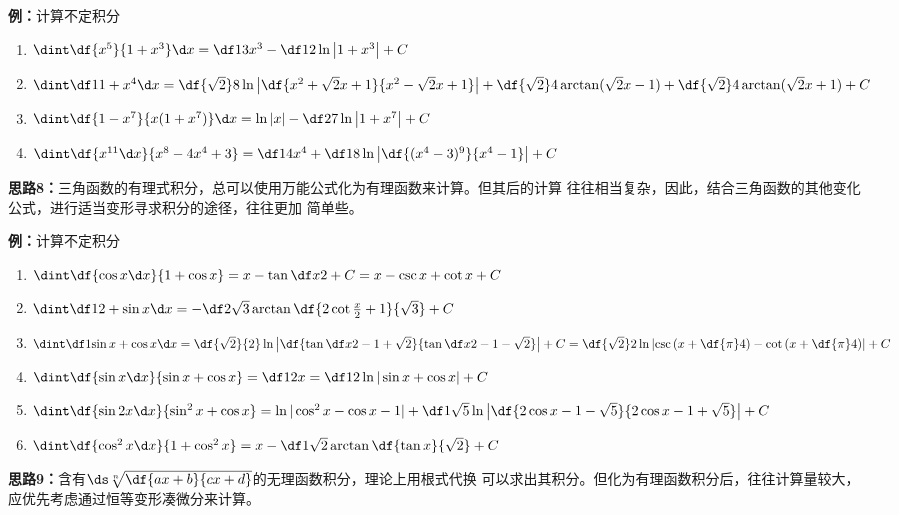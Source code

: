 {\bf 例：}计算不定积分
\begin{enumerate}[(1)]
  \setlength{\itemindent}{1cm}
  \item $\dint\df{x^5}{1+x^3}\d x=\df13x^3-\df12\ln\left|1+x^3\right|+C$
  \item $\dint\df1{1+x^4}\d x=\df{\sqrt 2}8\ln\left|
  \df{x^2+\sqrt2x+1}{x^2-\sqrt2x+1}\right|+\df{\sqrt 2}4\arctan(\sqrt2x-1)
  +\df{\sqrt2}4\arctan(\sqrt2x+1)+C$
  \item $\dint\df{1-x^7}{x(1+x^7)}\d x=\ln|x|-\df27\ln\left|1+x^7\right|+C$
  \item $\dint\df{x^{11}\d x}{x^8-4x^4+3}=\df14x^4+\df18
  \ln\left|\df{(x^4-3)^9}{x^4-1}\right|+C$
\end{enumerate}

\begin{shaded}
{\bf 思路8：}三角函数的有理式积分，总可以使用万能公式化为有理函数来计算。但其后的计算
往往相当复杂，因此，结合三角函数的其他变化公式，进行适当变形寻求积分的途径，往往更加
简单些。
\end{shaded}

{\bf 例：}计算不定积分
\begin{enumerate}[(1)]
  \setlength{\itemindent}{1cm}
  \item $\dint\df{\cos x\d x}{1+\cos x}=x-\tan\df x2+C=x-\csc x+\cot x+C$
  \item $\dint\df1{2+\sin x}\d x=-\df2{\sqrt3}\arctan\df{2\cot\frac 
  x2+1}{\sqrt 3}+C$
  \item $\dint\df1{\sin x+\cos x}\d x=\df{\sqrt 2}{2}\ln\left|
  \df{\tan\df x2-1+\sqrt 2}{\tan\df x2-1-\sqrt 2}\right|+C
  =\df{\sqrt2}2\ln\left|\csc\left(x+\df{\pi}4\right)
  -\cot\left(x+\df{\pi}4\right)\right|+C$
  \item $\dint\df{\sin x\d x}{\sin x+\cos x}=\df12x=\df12
  \ln|\sin x+\cos x|+C$
  \item $\dint\df{\sin2x\d x}{\sin^2x+\cos x}=
  \ln|\cos^2x-\cos x-1|+\df1{\sqrt5}\ln\left|
  \df{2\cos x-1-\sqrt5}{2\cos x-1+\sqrt 5}\right|+C$
  \item $\dint\df{\cos^2x\d x}{1+\cos^2x}=x-\df1{\sqrt2}\arctan
  \df{\tan x}{\sqrt 2}+C$
\end{enumerate}

\begin{shaded}
{\bf 思路9：}含有$\ds\sqrt[n]{\df{ax+b}{cx+d}}$的无理函数积分，理论上用根式代换
可以求出其积分。但化为有理函数积分后，往往计算量较大，应优先考虑通过恒等变形凑微分来计算。
\end{shaded}

